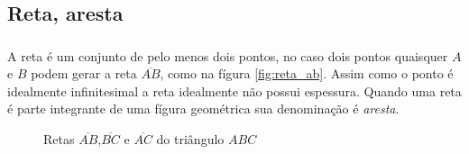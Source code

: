 \documentclass{beamer}
\begin{document}

\subsection{Reta, aresta}
\begin{frame}\frametitle{\subsecname}
    A reta é um conjunto de pelo menos dois pontos, no caso dois pontos quaisquer $A$ e $B$ podem gerar a reta $\overline{AB}$, como na fígura \ref{fig:reta_ab}.
    Assim como o ponto é idealmente infinitesimal a reta idealmente não possui espessura. Quando uma reta é parte
    integrante de uma fígura geométrica sua denominação é \textit{aresta}.

    \begin{figure}[H]
        \centering
        \caption{Retas $\overline{AB}$,$\overline{BC}$ e $\overline{AC}$ do triângulo $ABC$}
        \label{fig:tri_abc}
    \end{figure}
\end{frame}

\end{document}
